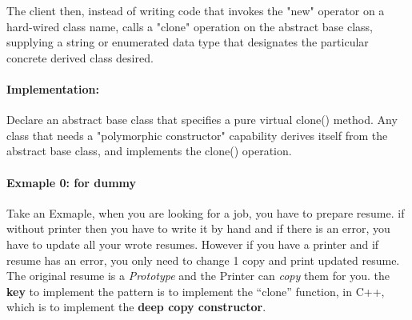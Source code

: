 \documentclass{book}
\begin{document}
The client then, instead of writing code that invokes the "new" operator on a hard-wired class name,
calls a "clone" operation on the abstract base class, supplying a string or enumerated data type that designates the particular concrete derived class desired.
\paragraph{Implementation:} Declare an abstract base class that specifies a pure virtual clone() method.
Any class that needs a "polymorphic constructor" capability derives itself from the abstract base class, and implements the clone() operation.
\paragraph{Exmaple 0: for dummy}
Take an Exmaple, when you are looking for a job, you have to prepare resume. if without printer then you have to write it by hand and if there is an error, you have to update all your wrote resumes.
However if you have a printer and if resume has an error, you only need to change 1 copy and print updated resume.
The original resume is a \textit{Prototype} and the Printer can \textit{copy} them for you. the \textbf{key} to implement the pattern is to implement the ``clone'' function, in C++, which is to 
implement the \textbf{deep copy constructor}.
\end{document}
